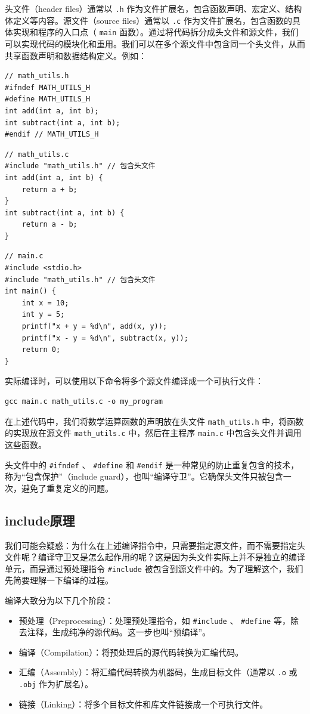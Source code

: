 头文件（header files）通常以 \texttt{.h} 作为文件扩展名，包含函数声明、宏定义、结构体定义等内容。源文件（source files）通常以 \texttt{.c} 作为文件扩展名，包含函数的具体实现和程序的入口点（ \texttt{main} 函数）。通过将代码拆分成头文件和源文件，我们可以实现代码的模块化和重用。我们可以在多个源文件中包含同一个头文件，从而共享函数声明和数据结构定义。例如：
\begin{verbatim}
// math_utils.h
#ifndef MATH_UTILS_H
#define MATH_UTILS_H
int add(int a, int b);
int subtract(int a, int b);
#endif // MATH_UTILS_H
\end{verbatim}
\begin{verbatim}
// math_utils.c
#include "math_utils.h" // 包含头文件
int add(int a, int b) {
    return a + b;
}
int subtract(int a, int b) {
    return a - b;
}
\end{verbatim}
\begin{verbatim}
// main.c
#include <stdio.h>
#include "math_utils.h" // 包含头文件
int main() {
    int x = 10;
    int y = 5;
    printf("x + y = %d\n", add(x, y));
    printf("x - y = %d\n", subtract(x, y));
    return 0;
}
\end{verbatim}

实际编译时，可以使用以下命令将多个源文件编译成一个可执行文件：
\begin{verbatim}
gcc main.c math_utils.c -o my_program
\end{verbatim}
在上述代码中，我们将数学运算函数的声明放在头文件 \texttt{math\_utils.h} 中，将函数的实现放在源文件 \texttt{math\_utils.c} 中，然后在主程序 \texttt{main.c} 中包含头文件并调用这些函数。

头文件中的 \texttt{\#ifndef} 、 \texttt{\#define} 和 \texttt{\#endif} 是一种常见的防止重复包含的技术，称为“包含保护”（include guard），也叫“编译守卫”。它确保头文件只被包含一次，避免了重复定义的问题。

\subsection{include原理}

我们可能会疑惑：为什么在上述编译指令中，只需要指定源文件，而不需要指定头文件呢？编译守卫又是怎么起作用的呢？这是因为头文件实际上并不是独立的编译单元，而是通过预处理指令 \texttt{\#include} 被包含到源文件中的。为了理解这个，我们先简要理解一下编译的过程。

编译大致分为以下几个阶段：
\begin{itemize}
    \item 预处理（Preprocessing）：处理预处理指令，如 \texttt{\#include} 、 \texttt{\#define} 等，除去注释，生成纯净的源代码。这一步也叫“预编译”。
    \item 编译（Compilation）：将预处理后的源代码转换为汇编代码。
    \item 汇编（Assembly）：将汇编代码转换为机器码，生成目标文件（通常以 \texttt{.o} 或 \texttt{.obj} 作为扩展名）。
    \item 链接（Linking）：将多个目标文件和库文件链接成一个可执行文件。
\end{itemize}

